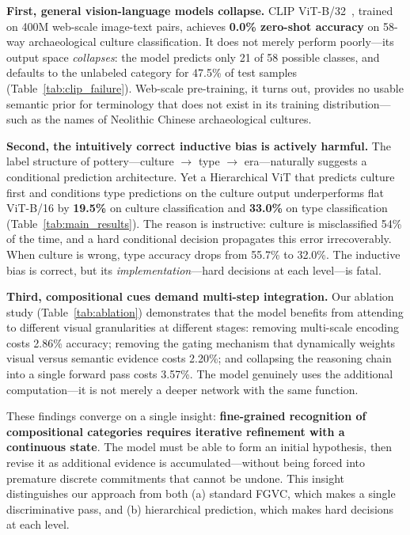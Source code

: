 \documentclass[10pt,twocolumn,letterpaper]{article}
\begin{document}
\textbf{First, general vision-language models collapse.} CLIP ViT-B/32~\cite{radford2021learning}, trained on 400M web-scale image-text pairs, achieves \textbf{0.0\% zero-shot accuracy} on 58-way archaeological culture classification. It does not merely perform poorly—its output space \emph{collapses}: the model predicts only 21 of 58 possible classes, and defaults to the unlabeled category for 47.5\% of test samples (Table~\ref{tab:clip_failure}). Web-scale pre-training, it turns out, provides no usable semantic prior for terminology that does not exist in its training distribution—such as the names of Neolithic Chinese archaeological cultures.

\textbf{Second, the intuitively correct inductive bias is actively harmful.} The label structure of pottery—culture $\rightarrow$ type $\rightarrow$ era—naturally suggests a conditional prediction architecture. Yet a Hierarchical ViT that predicts culture first and conditions type predictions on the culture output underperforms flat ViT-B/16 by \textbf{19.5\%} on culture classification and \textbf{33.0\%} on type classification (Table~\ref{tab:main_results}). The reason is instructive: culture is misclassified 54\% of the time, and a hard conditional decision propagates this error irrecoverably. When culture is wrong, type accuracy drops from 55.7\% to 32.0\%. The inductive bias is correct, but its \emph{implementation}—hard decisions at each level—is fatal.

\textbf{Third, compositional cues demand multi-step integration.} Our ablation study (Table~\ref{tab:ablation}) demonstrates that the model benefits from attending to different visual granularities at different stages: removing multi-scale encoding costs 2.86\% accuracy; removing the gating mechanism that dynamically weights visual versus semantic evidence costs 2.20\%; and collapsing the reasoning chain into a single forward pass costs 3.57\%. The model genuinely uses the additional computation—it is not merely a deeper network with the same function.

These findings converge on a single insight: \textbf{fine-grained recognition of compositional categories requires iterative refinement with a continuous state}. The model must be able to form an initial hypothesis, then revise it as additional evidence is accumulated—without being forced into premature discrete commitments that cannot be undone. This insight distinguishes our approach from both (a) standard FGVC, which makes a single discriminative pass, and (b) hierarchical prediction, which makes hard decisions at each level.
\end{document}
